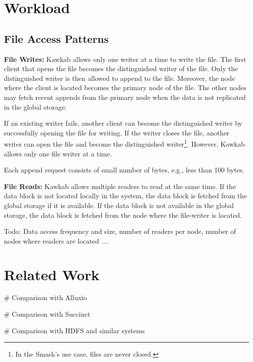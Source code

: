 \documentclass[]{article}
\newcommand{\subtopic}[1]{\vspace{1.5pt} \noindent \textbf{#1}}
\begin{document}

\section{Workload}

\subsection{File Access Patterns}

\subtopic{File Writes:} Kawkab allows only one writer at a time to
write the file. The first client that opens the file becomes the distinguished
writer of the file. Only the distinguished writer is then allowed to append to
the file. Moreover, the node where the client is located becomes the primary
node of the file.  The other nodes may fetch recent appends from the primary
node when the data is not replicated in the global storage.

If an existing writer fails, another client can become the distinguished writer
by successfully opening the file for writing. If the writer closes the file,
another writer can open the file and become the distinguished
writer\footnote{In the Smash's use case, files are never closed.}. However,
Kawkab allows only one file writer at a time.

Each append request consists of small number of bytes, e.g., less than 100 bytes.

\subtopic{File Reads:}
Kawkab allows multiple readers to read at the same time. If the data block
is not located locally in the system, the data block is fetched from the global storage if
it is available. If the data block is not available in the global storage, the data block
is fetched from the node where the file-writer is located.

Todo: Data access frequency and size, number of readers per node, number of
nodes where readers are located $\ldots$.




\section{Related Work}

\begin{easylist}[itemize]

 # Comparison with Alluxio

 # Comparison with Succinct

 # Comparison with HDFS and similar systems

\end{easylist}
\end{document}
